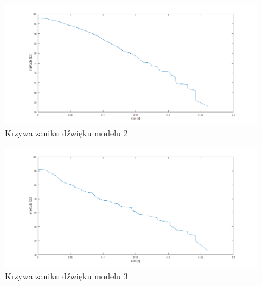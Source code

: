 \begin{figure}[h]
        \centering
                \centering
                \includegraphics[width=12cm]{zanikz2}
	\caption{Krzywa zaniku dźwięku modelu 2.}
\end{figure}

\begin{figure}[h]
        \centering
                \centering
                \includegraphics[width=12cm]{zanikz3}
	\caption{Krzywa zaniku dźwięku modelu 3.}
\end{figure}







